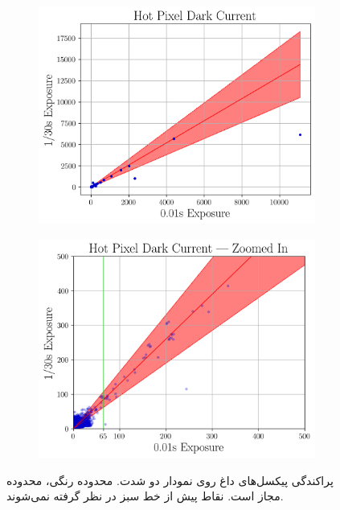 \documentclass[12pt,a4paper]{article}
\begin{document}
	\begin{figure}
		\centering
		\begin{subfigure}{0.49\linewidth}
			\centering
			\includegraphics[width=\linewidth]{../fig/hotpix}
		\end{subfigure}
		\begin{subfigure}{0.49\linewidth}
			\centering
			\includegraphics[width=\linewidth]{../fig/hotpix-zoom}
		\end{subfigure}
		\caption{پراکندگی پیکسل‌های داغ روی نمودار دو شدت. محدوده رنگی، محدوده مجاز است. نقاط پیش از خط سبز
			در نظر گرفته نمی‌شوند.}
		\label{fig:hotpix}
	\end{figure}
	
\end{document}
